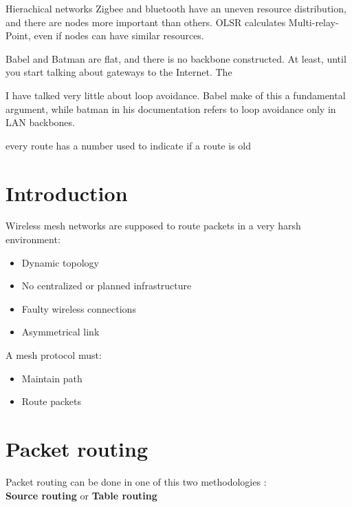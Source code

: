\documentclass{article}
\begin{document}
Hierachical networks
Zigbee and bluetooth have an uneven resource distribution, and there are nodes more important than others.
OLSR calculates Multi-relay-Point, even if nodes can have similar resources.

Babel and Batman are flat, and there is no backbone constructed.
At least, until you start talking about gateways to the Internet.
The 

I have talked very little about loop avoidance.
Babel make of this a fundamental argument, while batman in his documentation refers to loop avoidance only in LAN backbones.

every route has a number used to indicate if a route is old



\section{Introduction}

Wireless mesh networks are supposed to route packets in a very harsh environment:

\begin{itemize}
    \item Dynamic topology
    \item No centralized or planned infrastructure
    \item Faulty wireless connections
    \item Asymmetrical link 
\end{itemize}

A mesh protocol must:
\begin{itemize}
    \item Maintain path
    \item Route packets
\end{itemize}



\section{Packet routing}


Packet routing can be done in one of this two methodologies :
\\\textbf{Source routing} or \textbf{Table routing}

\end{document}
